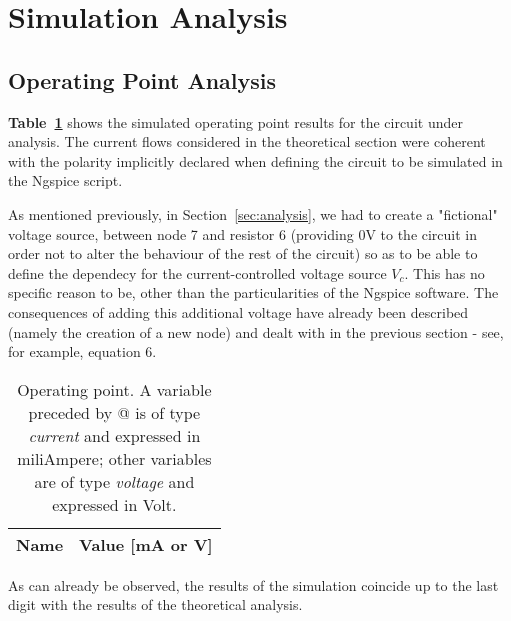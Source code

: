 \section{Simulation Analysis}
\label{sec:simulation}
\subsection{Operating Point Analysis}
\textbf{Table~\ref{tab:op}} shows the simulated operating point results for the circuit
under analysis. The current flows considered in the theoretical section were coherent with the polarity implicitly declared when defining the circuit to be simulated in the Ngspice script.\par
As mentioned previously, in Section~\ref{sec:analysis}, we had to create a "fictional" voltage source, between node 7 and resistor 6 (providing 0V to the circuit in order not to alter the behaviour of the rest of the circuit) so as to be able to define the dependecy for the current-controlled voltage source {\it $V_c$}. This has no specific reason to be, other than the particularities of the Ngspice software. The consequences of adding this additional voltage have already been described (namely the creation of a new node) and dealt with in the previous section - see, for example, equation 6.\par

\begin{table}[h]
  \centering
  \begin{tabular}{|l|r|}
    \hline    
    {\bf Name} & {\bf Value [mA or V]} \\ \hline
    
  \end{tabular}
  \caption{Operating point. A variable preceded by @ is of type {\em current}
    and expressed in miliAmpere; other variables are of type {\it voltage} and expressed in
    Volt.}
  \label{tab:op}
\end{table}

As can already be observed, the results of the simulation coincide up to the last digit with the results of the theoretical analysis.

